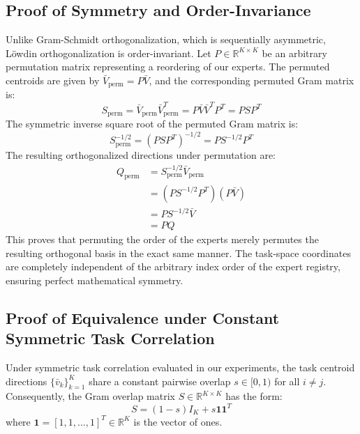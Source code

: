 \documentclass{article}
\theoremstyle{plain}
\theoremstyle{definition}
\theoremstyle{remark}
\begin{document}
\subsection{Proof of Symmetry and Order-Invariance}
Unlike Gram-Schmidt orthogonalization, which is sequentially asymmetric, L{\"o}wdin orthogonalization is order-invariant. Let $P \in \mathbb{R}^{K \times K}$ be an arbitrary permutation matrix representing a reordering of our experts. The permuted centroids are given by $\bar{V}_{\text{perm}} = P \bar{V}$, and the corresponding permuted Gram matrix is:
\begin{equation}
S_{\text{perm}} = \bar{V}_{\text{perm}} \bar{V}_{\text{perm}}^T = P \bar{V} \bar{V}^T P^T = P S P^T
\end{equation}
The symmetric inverse square root of the permuted Gram matrix is:
\begin{equation}
S_{\text{perm}}^{-1/2} = (P S P^T)^{-1/2} = P S^{-1/2} P^T
\end{equation}
The resulting orthogonalized directions under permutation are:
\begin{align}
Q_{\text{perm}} &= S_{\text{perm}}^{-1/2} \bar{V}_{\text{perm}} \\
&= \left( P S^{-1/2} P^T \right) \left( P \bar{V} \right) \\
&= P S^{-1/2} \bar{V} \\
&= P Q
\end{align}
This proves that permuting the order of the experts merely permutes the resulting orthogonal basis in the exact same manner. The task-space coordinates are completely independent of the arbitrary index order of the expert registry, ensuring perfect mathematical symmetry.

\subsection{Proof of Equivalence under Constant Symmetric Task Correlation}
\label{app:equivalence}

Under symmetric task correlation evaluated in our experiments, the task centroid directions $\{\bar{v}_k\}_{k=1}^K$ share a constant pairwise overlap $s \in [0, 1)$ for all $i \neq j$. Consequently, the Gram overlap matrix $S \in \mathbb{R}^{K \times K}$ has the form:
\begin{equation}
S = (1 - s) I_K + s \mathbf{1}\mathbf{1}^T
\end{equation}
where $\mathbf{1} = [1, 1, \dots, 1]^T \in \mathbb{R}^K$ is the vector of ones. 
\end{document}
